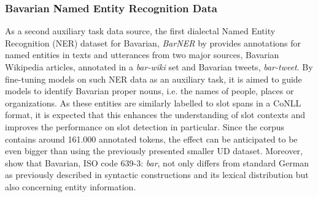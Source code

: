 \documentclass[11pt,a4paper,twoside,openright]{scrbook}
\begin{document}
\subsubsection{Bavarian Named Entity Recognition Data}

As a second auxiliary task data source, the first dialectal Named Entity Recognition (NER) dataset for Bavarian, \textit{BarNER} by \citet{peng-etal-2024-sebastian-basti} provides annotations for named entities in texts and utterances from two major sources, Bavarian Wikipedia articles, annotated in a \textit{bar-wiki} set and Bavarian tweets, \textit{bar-tweet}. By fine-tuning models on such NER data as an auxiliary task, it is aimed to guide models to identify Bavarian proper nouns, i.e. the names of people, places or organizations. As these entities are similarly labelled to slot spans in a CoNLL format, it is expected that this enhances the understanding of slot contexts and improves the performance on slot detection in particular. Since the corpus contains around 161.000 annotated tokens, the effect can be anticipated to be even bigger than using the previously presented smaller UD dataset. Moreover, \citet{peng-etal-2024-sebastian-basti} show that Bavarian, ISO code 639-3: \textit{bar}, not only differs from standard German as previously described in syntactic constructions and its lexical distribution but also concerning entity information.
\end{document}
